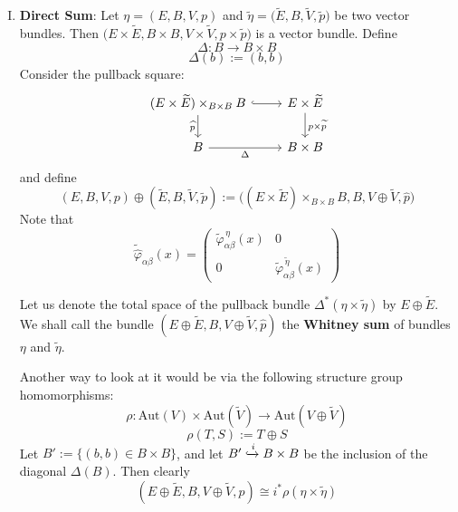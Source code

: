 \documentclass[11pt,a4paper]{article}
\begin{document}
\begin{enumerate}[(I)]
    \item \textbf{Direct Sum}: Let $\eta = (E, B, V, p)$ and $\widetilde{\eta} = \big(\widetilde{E}, B, \widetilde{V}, \widetilde{p}\big)$ be two vector bundles. Then $\big(E\times\widetilde{E}, B\times B, V\times\widetilde{V}, p\times \widetilde{p}\big)$ is a vector bundle. Define
$$\Delta: B \rightarrow B\times B$$
$$\Delta(b):= (b,b)$$
Consider the pullback square:
$$\begin{tikzcd}
    (E\cross\widetilde{E})\cross_{B\cross B}B \arrow[hookrightarrow]{r} \arrow[d, "\widehat{p}"'] &E\cross \widetilde{E} \arrow[d, "p\cross \widetilde{p}"]\\ B \arrow[r, "\Delta"'] & B\cross B
\end{tikzcd}$$
and define
$$(E, B, V, p)\oplus (\widetilde{E}, B, \widetilde{V}, \widetilde{p}):= \big((E\times\widetilde{E})\times_{B\times B}B, B, V\oplus\widetilde{V}, \widehat{p}\big)$$
Note that
$$\widetilde{\widehat{\varphi}}_{\alpha\beta}(x) = \begin{pmatrix}
    \widetilde{\varphi}^{\,\eta}_{\alpha\beta}(x) & 0\\ 0 &\widetilde{\varphi}^{\,\widetilde\eta}_{\alpha\beta}(x)
\end{pmatrix}$$


Let us denote the total space of the pullback bundle $\Delta^*(\eta\times\widetilde{\eta})$ by $E\oplus\widetilde{E}$. We shall call the bundle $(E\oplus\widetilde{E}, B, V\oplus\widetilde{V}, \widehat{p})$ the \textbf{Whitney sum} of bundles $\eta$ and $\widetilde{\eta}$.

Another way to look at it would be via the following structure group homomorphisms:
$$\rho: \text{Aut}(V)\times\text{Aut}(\widetilde{V}) \rightarrow \text{Aut}(V\oplus\widetilde{V})$$
$$\rho(T, S):= T\oplus S$$
Let $B':= \{(b, b) \in B\times B\}$, and let $B'\xhookrightarrow{i} B\times B$ be the inclusion of the diagonal $\Delta(B)$. Then clearly
$$(E\oplus\widetilde{E}, B, V\oplus\widetilde{V}, \widehat{p}) \cong i^*\rho(\eta\times\widetilde{\eta})$$


\end{enumerate}
\end{document}
